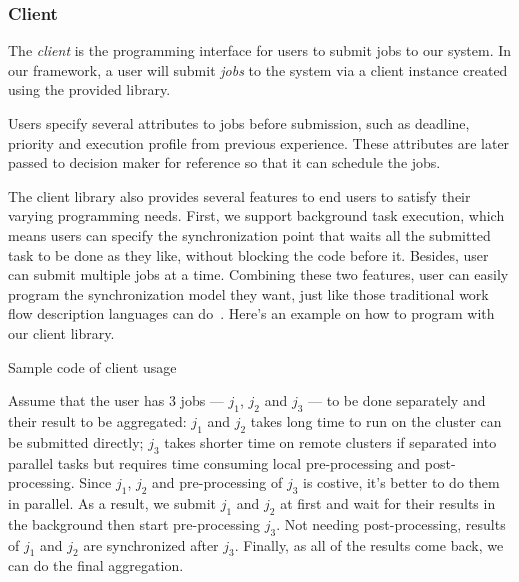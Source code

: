 \subsubsection{Client}	%

The \emph{client} is the programming interface for users to submit jobs
to our system.
In our framework, a user will submit \emph{jobs} to the system via a
client instance created using the provided library.

Users specify several attributes to jobs before submission, such as
deadline, priority and execution profile from previous experience.
These attributes are later passed to decision maker for reference so
that it can schedule the jobs.

The client library also provides several features to end users to
satisfy their varying programming needs.
First, we support background task execution, which means users can
specify the synchronization point that waits all the submitted task to
be done as they like, without blocking the code before it.
Besides, user can submit multiple jobs at a time.
Combining these two features, user can easily program the
synchronization model they want, just like those traditional work flow
description languages can do~\cite{cite:workflow-management}.
Here's an example on how to program with our client library.

\begin{Example Code}
  
  \caption{Sample code of client usage}
\end{Example Code}

Assume that the user has 3 jobs --- $j_1$, $j_2$ and $j_3$ --- to be
done separately and their result to be aggregated:  $j_1$ and $j_2$
takes long time to run on the cluster can be submitted directly; $j_3$
takes shorter time on remote clusters if separated into parallel tasks
but requires time consuming local pre-processing and post-processing.
Since $j_1$, $j_2$ and pre-processing of $j_3$ is costive, it's better
to do them in parallel.
As a result, we submit $j_1$ and $j_2$ at first and wait for their
results in the background then start pre-processing $j_3$. Not needing
post-processing, results of $j_1$ and $j_2$ are synchronized after
$j_3$.
Finally, as all of the results come back, we can do the final
aggregation.


